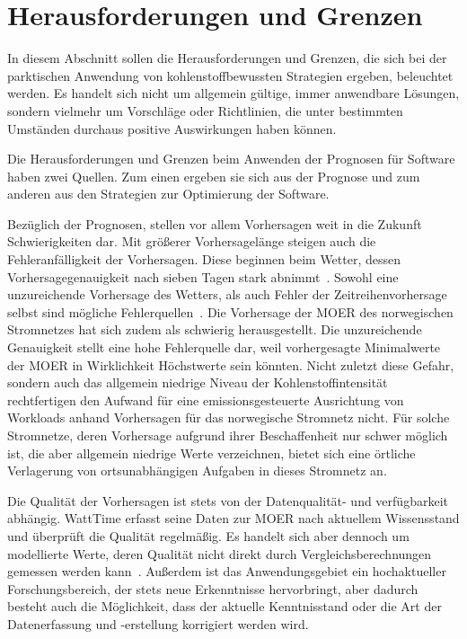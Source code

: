\section{Herausforderungen und Grenzen}
In diesem Abschnitt sollen die Herausforderungen und Grenzen, die sich bei der parktischen Anwendung von kohlenstoffbewussten Strategien ergeben, beleuchtet werden.
Es handelt sich nicht um allgemein gültige, immer anwendbare Lösungen, sondern vielmehr um Vorschläge oder Richtlinien, die unter bestimmten Umständen durchaus positive Auswirkungen haben können.

Die Herausforderungen und Grenzen beim Anwenden der Prognosen für Software haben zwei Quellen.
Zum einen ergeben sie sich aus der Prognose und zum anderen aus den Strategien zur Optimierung der Software.

Bezüglich der Prognosen, stellen vor allem Vorhersagen weit in die Zukunft Schwierigkeiten dar.
Mit größerer Vorhersagelänge steigen auch die Fehleranfälligkeit der Vorhersagen.
Diese beginnen beim Wetter, dessen Vorhersagegenauigkeit nach sieben Tagen stark abnimmt~\cite{Lam.2022}.
Sowohl eine unzureichende Vorhersage des Wetters, als auch Fehler der Zeitreihenvorhersage selbst sind mögliche Fehlerquellen~\cite{Wiesner.2021}.
Die Vorhersage der \ac{MOER} des norwegischen Stromnetzes hat sich zudem als schwierig herausgestellt.
Die unzureichende Genauigkeit stellt eine hohe Fehlerquelle dar, weil vorhergesagte Minimalwerte der \ac{MOER} in Wirklichkeit Höchstwerte sein könnten.
Nicht zuletzt diese Gefahr, sondern auch das allgemein niedrige Niveau der Kohlenstoffintensität rechtfertigen den Aufwand für eine emissionsgesteuerte Ausrichtung von Workloads anhand Vorhersagen für das norwegische Stromnetz nicht.
Für solche Stromnetze, deren Vorhersage aufgrund ihrer Beschaffenheit nur schwer möglich ist, die aber allgemein niedrige Werte verzeichnen, bietet sich eine örtliche Verlagerung von ortsunabhängigen Aufgaben in dieses Stromnetz an.

Die Qualität der Vorhersagen ist stets von der Datenqualität- und verfügbarkeit abhängig.
WattTime erfasst seine Daten zur \ac{MOER} nach aktuellem Wissensstand und überprüft die Qualität regelmäßig.
Es handelt sich aber dennoch um modellierte Werte, deren Qualität nicht direkt durch Vergleichsberechnungen gemessen werden kann~\cite{WattTime.2022}.
Außerdem ist das Anwendungsgebiet ein hochaktueller Forschungsbereich, der stets neue Erkenntnisse hervorbringt, aber dadurch besteht auch die Möglichkeit, dass der aktuelle Kenntnisstand oder die Art der Datenerfassung und -erstellung korrigiert werden wird.

